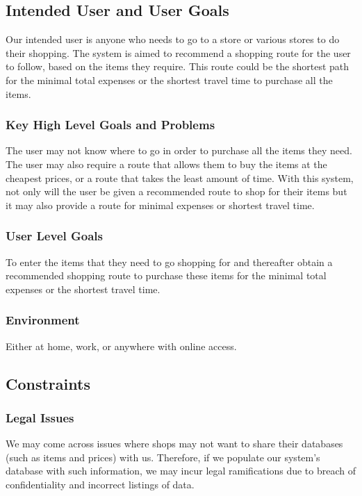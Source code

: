 \documentclass[12pt]{article}
\begin{document}
\subsection{Intended User and User Goals}
Our intended user is anyone who needs to go to a store or various stores to do their shopping. The system is aimed to recommend a shopping route for the user to follow, based on the items they require. This route could be the shortest path for the minimal total expenses or the shortest travel time to purchase all the items.
\subsubsection{Key High Level Goals and Problems}
The user may not know where to go in order to purchase all the items they need. The user may also require a route that allows them to buy the items at the cheapest prices, or a route that takes the least amount of time.
With this system, not only will the user be given a recommended route to shop for their items but it may also provide a route for minimal expenses or shortest travel time.
\subsubsection{User Level Goals}
To enter the items that they need to go shopping for and thereafter obtain a recommended shopping route to purchase these items for the minimal total expenses or the shortest travel time.
\subsubsection{Environment}
Either at home, work, or anywhere with online access.

\subsection{Constraints}
\subsubsection{Legal Issues}
We may come across issues where shops may not want to share their databases (such as items and prices) with us. Therefore, if we populate our system's database with such information, we may incur legal ramifications due to breach of confidentiality and incorrect listings of data. 
\end{document}
